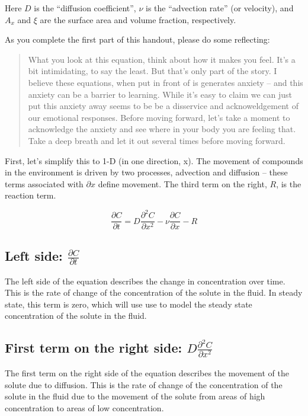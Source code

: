 \documentclass{tufte-handout}\usepackage[]{graphicx}\usepackage[]{xcolor}
\begin{document}
Here $D$ is the ``diffusion coefficient'', $\nu$ is the ``advection rate'' (or velocity), and $A_x$ and $\xi$ are the surface area and volume fraction, respectively.

As you complete the first part of this handout, please do some reflecting: 

\begin{quote}

What you look at this equation, think about how it makes you feel. It's a bit intimidating, to say the least. But that's only part of the story. I believe these equations, when put in front of is generates anxiety -- and this anxiety can be a barrier to learning. While it's easy to claim we can just put this anxiety away seems to be be a disservice and acknoweldgement of our emotional responses. Before moving forward, let's take a moment to acknowledge the anxiety and see where in your body you are feeling that. Take a deep breath and let it out several times before moving forward.

\end{quote} 

First, let's simplify this to 1-D (in one direction, x). The movement of compounds in the environment is driven by two processes, advection and diffusion -- these terms associated with $\partial x$ define movement. The third term on the right, $R$, is the reaction term.

\begin{equation}
\frac{\partial C}{\partial t} = D \frac{\partial^2 C}{\partial x^2} - \nu \frac{\partial C}{\partial x} - R
\end{equation}

\subsection{Left side: $\frac{\partial C}{\partial t}$}

The left side of the equation describes the change in concentration over time. This is the rate of change of the concentration of the solute in the fluid. In steady state, this term is zero, which will use use to model the steady state concentration of the solute in the fluid.

\subsection{First term on the right side: $D \frac{\partial^2 C}{\partial x^2}$}

The first term on the right side of the equation describes the movement of the solute due to diffusion. This is the rate of change of the concentration of the solute in the fluid due to the movement of the solute from areas of high concentration to areas of low concentration.
\end{document}
